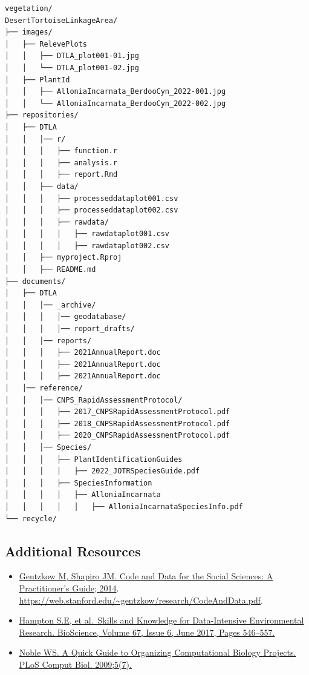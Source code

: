 \documentclass[
]{book}
\providecommand{\tightlist}{%
  \setlength{\itemsep}{0pt}\setlength{\parskip}{0pt}}
\begin{document}
\begin{verbatim}
vegetation/
DesertTortoiseLinkageArea/
├── images/
│   ├── RelevePlots
│   │   ├── DTLA_plot001-01.jpg
│   │   └── DTLA_plot001-02.jpg
│   ├── PlantId
│   │   ├── AlloniaIncarnata_BerdooCyn_2022-001.jpg
│   │   └── AlloniaIncarnata_BerdooCyn_2022-002.jpg
├── repositories/
│   ├── DTLA
│   │   │── r/
│   │   │   ├── function.r
│   │   │   ├── analysis.r
│   │   │   ├── report.Rmd
│   │   ├── data/
│   │   │   ├── processeddataplot001.csv
│   │   │   ├── processeddataplot002.csv
│   │   │   ├── rawdata/
│   │   │   │   ├── rawdataplot001.csv
│   │   │   │   ├── rawdataplot002.csv
│   │   ├── myproject.Rproj
│   │   ├── README.md
├── documents/
│   ├── DTLA
│   │   │── _archive/
│   │   │   │── geodatabase/
│   │   │   │── report_drafts/
│   │   │── reports/
│   │   │   ├── 2021AnnualReport.doc
│   │   │   ├── 2021AnnualReport.doc
│   │   │   ├── 2021AnnualReport.doc
│   │── reference/
│   │   │── CNPS_RapidAssessmentProtocol/
│   │   │   ├── 2017_CNPSRapidAssessmentProtocol.pdf
│   │   │   ├── 2018_CNPSRapidAssessmentProtocol.pdf
│   │   │   ├── 2020_CNPSRapidAssessmentProtocol.pdf
│   │   │── Species/
│   │   │   ├── PlantIdentificationGuides
│   │   │   │   ├── 2022_JOTRSpeciesGuide.pdf
│   │   │   ├── SpeciesInformation
│   │   │   │   ├── AlloniaIncarnata
│   │   │   │   │   ├── AlloniaIncarnataSpeciesInfo.pdf
└── recycle/
\end{verbatim}

\hypertarget{additional-resources}{%
\subsection{Additional Resources}\label{additional-resources}}

\begin{itemize}
\tightlist
\item
  \href{https://web.stanford.edu/~gentzkow/research/CodeAndData.pdf}{Gentzkow M, Shapiro JM. Code and Data for the Social Sciences: A Practitioner's Guide; 2014}. \url{https://web.stanford.edu/~gentzkow/research/CodeAndData.pdf}.
\item
  \href{https://academic.oup.com/bioscience/article/67/6/546/3784601}{Hampton S.E, et al.~Skills and Knowledge for Data-Intensive Environmental Research. BioScience, Volume 67, Issue 6, June 2017, Pages 546--557.}
\item
  \href{https://journals.plos.org/ploscompbiol/article?id=10.1371/journal.pcbi.1000424}{Noble WS. A Quick Guide to Organizing Computational Biology Projects. PLoS Comput Biol. 2009;5(7).}
\end{itemize}
\end{document}
